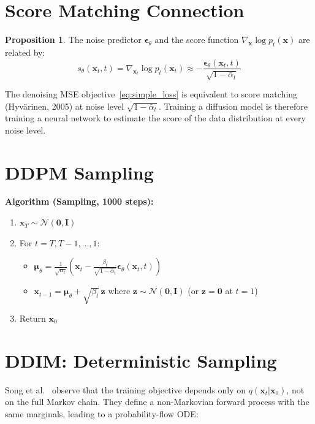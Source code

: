 \documentclass[11pt, a4paper]{article}
\theoremstyle{definition}
\newtheorem{proposition}{Proposition}[section]
\newcommand{\bx}{\bm{x}}
\newcommand{\bepsilon}{\bm{\epsilon}}
\newcommand{\bmu}{\bm{\mu}}
\newcommand{\bI}{\bm{I}}
\newcommand{\N}{\mathcal{N}}
\newcommand{\abar}{\bar{\alpha}}
\begin{document}
\section{Score Matching Connection}

\begin{proposition}
The noise predictor $\bepsilon_\theta$ and the score function $\nabla_\bx \log p_t(\bx)$
are related by:
\begin{equation}
  s_\theta(\bx_t, t) = \nabla_{\bx_t} \log p_t(\bx_t) \approx
  -\frac{\bepsilon_\theta(\bx_t, t)}{\sqrt{1-\abar_t}}
\end{equation}
\end{proposition}

The denoising MSE objective~\eqref{eq:simple_loss} is equivalent to score matching
(Hyvärinen, 2005) at noise level $\sqrt{1-\abar_t}$. Training a diffusion model is therefore
training a neural network to estimate the score of the data distribution at every noise level.

\section{DDPM Sampling}

\textbf{Algorithm (Sampling, 1000 steps):}
\begin{enumerate}[noitemsep]
  \item $\bx_T \sim \N(\bm{0}, \bI)$
  \item For $t = T, T-1, \ldots, 1$:
  \begin{itemize}[noitemsep]
    \item $\bmu_\theta = \frac{1}{\sqrt{\alpha_t}}\!\left(\bx_t -
          \frac{\beta_t}{\sqrt{1-\abar_t}}\bepsilon_\theta(\bx_t, t)\right)$
    \item $\bx_{t-1} = \bmu_\theta + \sqrt{\beta_t}\,\bm{z}$ where $\bm{z} \sim \N(\bm{0},\bI)$
          (or $\bm{z}=\bm{0}$ at $t=1$)
  \end{itemize}
  \item Return $\bx_0$
\end{enumerate}

\section{DDIM: Deterministic Sampling}

Song et al.~\cite{song2020ddim} observe that the training objective depends only on
$q(\bx_t|\bx_0)$, not on the full Markov chain. They define a non-Markovian forward process
with the same marginals, leading to a probability-flow ODE:
\end{document}
